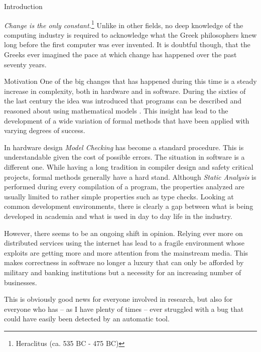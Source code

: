 %

\begin{chapter}{Introduction}
	\label{chapter:introduction}

	\emph{Change is the only constant.}\footnote{Heraclitus (ca. 535 BC - 475 BC)} Unlike in other fields, no deep knowledge of the computing industry is required to acknowledge what the Greek philosophers knew long before the first computer was ever invented. It is doubtful though, that the Greeks ever imagined the pace at which change has happened over the past seventy years.

	\begin{section}{Motivation}
		One of the big changes that has happened during this time is a steady increase in complexity, both in hardware and in software. During the sixties of the last century the idea was introduced that programs can be described and reasoned about using mathematical models \cite{floyd67, hoare69}. This insight has lead to the development of a wide variation of formal methods that have been applied with varying degrees of success. 
		
		In hardware design \emph{Model Checking} has become a standard procedure. This is understandable given the cost of possible errors. The situation in software is a different one. While having a long tradition in compiler design and safety critical projects, formal methods generally have a hard stand. Although \emph{Static Analysis} is performed during every compilation of a program, the properties analyzed are usually limited to rather simple properties such as type checks. Looking at common development environments, there is clearly a gap between what is being developed in academia and what is used in day to day life in the industry.

		However, there seems to be an ongoing shift in opinion. Relying ever more on distributed services using the internet has lead to a fragile environment whose exploits are getting more and more attention from the mainstream media. This makes correctness in software no longer a luxury that can only be afforded by military and banking institutions but a necessity for an increasing number of businesses.

		This is obviously good news for everyone involved in research, but also for everyone who has -- as I have plenty of times -- ever struggled with a bug that could have easily been detected by an automatic tool. 
	\end{section}


\end{chapter}
